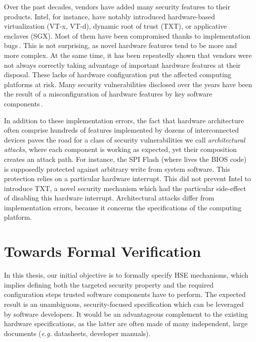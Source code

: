 Over the past decades, vendors have added many security features to their
products.
%
Intel, for instance, have notably introduced hardware-based virtualization
(VT-x, VT-d), dynamic root of trust (TXT), or applicative enclaves (SGX).
%
Most of them have been compromised thanks to implementation
bugs\,\cite{wojtczuk2011txtbug,sang2010iommu}.
%
This is not surprising, as novel hardware features tend to be more and more
complex.
%
At the same time, it has been repeatedly shown that vendors were not always
correctly taking advantage of important hardware features at their disposal.
%
These lacks of hardware configuration put the affected computing platforms at
risk.
%
Many security vulnerabilities disclosed over the years have been the result of a
misconfiguration of hardware features by key software
components\,\cite{bulygin2014bios}.

In addition to these implementation errors, the fact that hardware architecture
often comprise hundreds of features implemented by dozens of interconnected
devices paves the road for a class of security vulnerabilities we call
\emph{architectural attacks}, where each component is working as expected, yet
their composition creates an attack path.
%
For instance, the SPI Flash (where lives the BIOS code) is supposedly protected
against arbitrary write from system software.
%
This protection relies on a particular hardware interrupt.
%
This did not prevent Intel to introduce TXT, a novel security mechanism which
had the particular side-effect of disabling this hardware interrupt.
%
Architectural attacks differ from implementation errors, because it concerns the
specifications of the computing platform.

\section{Towards Formal Verification}

In this thesis, our initial objective is to formally specify HSE mechanisms,
which implies defining both the targeted security property and the required
configuration steps trusted software components have to perform.
%
The expected result is an unambiguous, security-focused specification which can
be leveraged by software developers.
%
It would be an advantageous complement to the existing hardware specifications,
as the latter are often made of many independent, large documents (\emph{e.g.}
datasheets, developer manuals).

